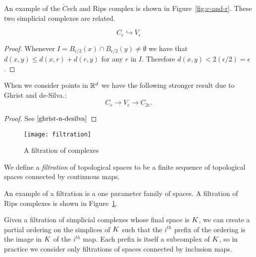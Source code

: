 An example of the $\check{C}$ech and Rips complex is shown in Figure~\ref{fig:c-and-r}. These two simplicial complexes are related.
\begin{theorem}
\[ C_\epsilon \hookrightarrow V_\epsilon \]
\end{theorem}
\begin{proof}
Whenever $I = B_{\epsilon/2}(x) \cap B_{\epsilon/2}(y) \neq \emptyset$ we have that $d(x,y) \leq d(x,r) + d(r,y)$ for any $r$ in $I$. Therefore $d(x,y) < 2(\epsilon/2) = \epsilon$. 
\end{proof}
\begin{theorem}
When we consider points in $\mathbb{R}^d$ we have the following stronger result due to Ghrist and de-Silva.:
\[ C_\epsilon \rightarrow V_\epsilon \rightarrow C_{2\epsilon}. \]
\end{theorem}
\begin{proof}
See $\cite{ghrist-n-desilva}$
\end{proof}
\begin{figure}
\centering
\texttt{[image: filtration]}
\caption{A filtration of complexes}
\label{fig:rips-filt}
\end{figure}
\begin{definition}
We define a \emph{filtration} of topological spaces to be a finite sequence of topological spaces connected by
continuous maps.
\end{definition} 
An example of a filtration is a one parameter family of spaces. A filtration of Rips complexes is shown in Figure~\ref{fig:rips-filt}.

Given a filtration of simplicial complexes whose final space is $K$, we can create a  
partial ordering on the simplices of $K$ such that the $i^{th}$ prefix of the ordering is the image in $K$ of the $i^{th}$ map. Each prefix is itself a subcomplex of $K$, so in practice we consider only filtrations of spaces connected by inclusion maps.

